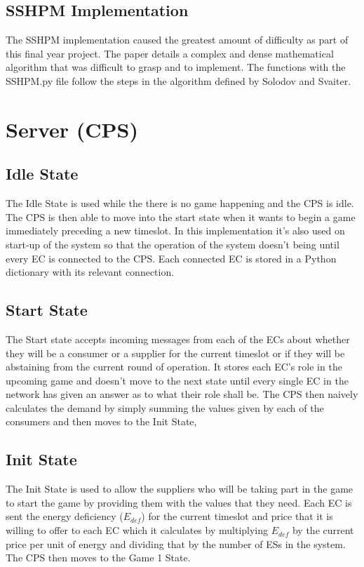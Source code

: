 \documentclass[a4paper, notitlepage]{report}
\begin{document}
\subsection{SSHPM Implementation}
\label{sec:org5c03d96}
The SSHPM implementation caused the greatest amount of difficulty as part of
this final year project. The paper \cite{solodov1999new} details a complex and
dense mathematical algorithm that was difficult to grasp and to implement. The
functions with the SSHPM.py file follow the steps in the algorithm defined by
Solodov and Svaiter.
\section{Server (CPS)}
\label{sec:org1cb9e36}
\subsection{Idle State}
\label{sec:org4d1d652}
The Idle State is used while the there is no game happening and the CPS is idle.
The CPS is then able to move into the start state when it wants to begin a game
immediately preceding a new timeslot. In this implementation it's also used on
start-up of the system so that the operation of the system doesn't being until
every EC is connected to the CPS. Each connected EC is stored in a Python
dictionary with its relevant connection.
\subsection{Start State}
\label{sec:orgad3e52e}
The Start state accepts incoming messages from each of the ECs about whether
they will be a consumer or a supplier for the current timeslot or if they will
be abstaining from the current round of operation. It stores each EC's role in
the upcoming game and doesn't move to the next state until every single EC in
the network has given an answer as to what their role shall be. The CPS then
naively calculates the demand by simply summing the values given by each of the
consumers and then moves to the Init State, 
\subsection{Init State}
\label{sec:org7244634}
The Init State is used to allow the suppliers who will be taking part in the
game to start the game by providing them with the values that they need. Each EC
is sent the energy deficiency (\(E_{def}\)) for the current timeslot and price that
it is willing to offer to each EC which it calculates by multiplying \(E_{def}\) by
the current price per unit of energy and dividing that by the number of ESs in
the system. The CPS then moves to the Game 1 State.
\end{document}
